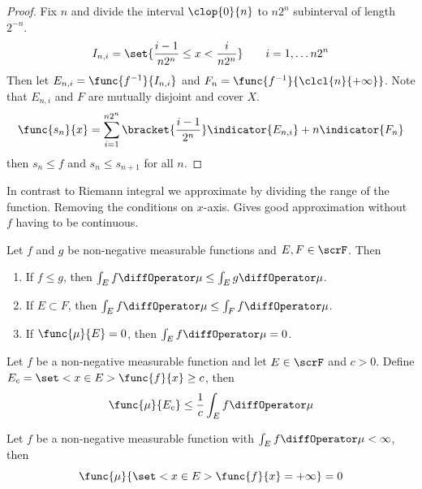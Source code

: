 \begin{proof}
    Fix \(n\) and divide the interval \(\clop{0}{n}\) to \(n2^n\) subinterval of length \(2^{-n}\). 
    \begin{equation*}
        I_{n,i} = \set{\dfrac{i-1}{n2^n} \leq x < \dfrac{i}{n2^n}} \qquad i = 1, \dots n2^n
    \end{equation*}
    Then let \(E_{n,i} = \func{f^{-1}}{I_{n,i}}\) and \(F_n = \func{f^{-1}}{\clcl{n}{+\infty}}\). Note that \(E_{n,i}\) and \(F\) are mutually disjoint and cover \(X\).
    \begin{equation*}
        \func{s_n}{x} = \sum_{i = 1}^{n2^n} \bracket{\dfrac{i - 1}{2^n}} \indicator{E_{n,i}} + n \indicator{F_n}
    \end{equation*}
    then \(s_n \leq f\) and \(s_n \leq s_{n+1}\) for all \(n\).
\end{proof}

In contrast to Riemann integral we approximate by dividing the range of the function. Removing the conditions on \(x\)-axis. Gives good approximation without \(f\) having to be continuous.

\begin{proposition}
    Let \(f\) and \(g\) be non-negative measurable functions and \(E,F \in \scrF\). Then 
    \begin{enumerate}
        \item If \(f \leq g\), then \(\int_E f \diffOperator \mu \leq \int_E g \diffOperator \mu \).
        \item If \(E \subset F\), then \(\int_E f \diffOperator \mu \leq \int_F f \diffOperator \mu \).
        \item If \(\func{\mu}{E} = 0\), then \(\int_E f \diffOperator \mu = 0\).
    \end{enumerate}
\end{proposition}

\begin{theorem}[Chebyshev]
    Let \(f\) be a non-negative measurable function and let \(E \in \scrF\) and \(c > 0\). Define \(E_c = \set<x \in E>{\func{f}{x} \geq c}\), then 
    \begin{equation*}
        \func{\mu}{E_c} \leq \dfrac{1}{c} \int_{E} f \diffOperator \mu 
    \end{equation*}
\end{theorem}

\begin{corollary}
    Let \(f\) be a non-negative measurable function with \(\int_E f \diffOperator \mu < \infty\), then
    \begin{equation*} 
        \func{\mu}{\set<x\in E>{\func{f}{x} = + \infty}} = 0
    \end{equation*}
\end{corollary}

